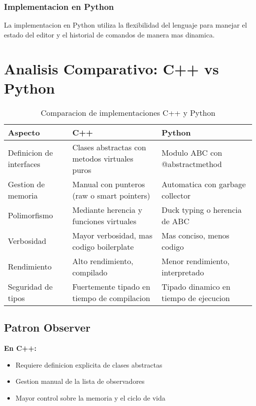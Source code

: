 \documentclass[11pt,a4paper]{article}
\begin{document}
\subsubsection{Implementacion en Python}

La implementacion en Python utiliza la flexibilidad del lenguaje para manejar el estado del editor y el historial de comandos de manera mas dinamica.

\section{Analisis Comparativo: C++ vs Python}

\begin{table}[H]
\centering
\caption{Comparacion de implementaciones C++ y Python}
\begin{tabular}{|p{3cm}|p{5cm}|p{5cm}|}
\hline
\textbf{Aspecto} & \textbf{C++} & \textbf{Python} \\
\hline
Definicion de interfaces & Clases abstractas con metodos virtuales puros & Modulo ABC con @abstractmethod \\
\hline
Gestion de memoria & Manual con punteros (raw o smart pointers) & Automatica con garbage collector \\
\hline
Polimorfismo & Mediante herencia y funciones virtuales & Duck typing o herencia de ABC \\
\hline
Verbosidad & Mayor verbosidad, mas codigo boilerplate & Mas conciso, menos codigo \\
\hline
Rendimiento & Alto rendimiento, compilado & Menor rendimiento, interpretado \\
\hline
Seguridad de tipos & Fuertemente tipado en tiempo de compilacion & Tipado dinamico en tiempo de ejecucion \\
\hline
\end{tabular}
\end{table}

\subsection{Patron Observer}

\textbf{En C++:}
\begin{itemize}
    \item Requiere definicion explicita de clases abstractas
    \item Gestion manual de la lista de observadores
    \item Mayor control sobre la memoria y el ciclo de vida
\end{itemize}
\end{document}
